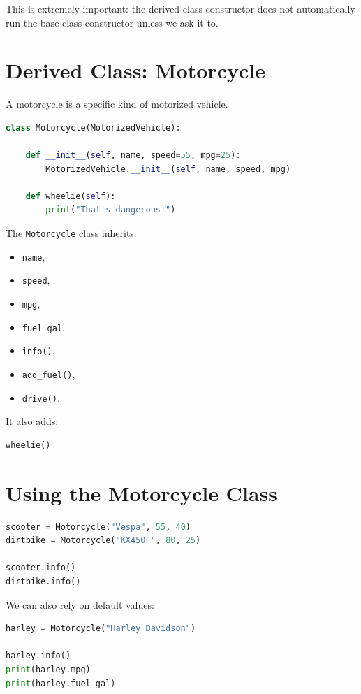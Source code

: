 \documentclass[11pt]{article}
\begin{document}
This is extremely important: the derived class constructor does not automatically run the base class constructor unless we ask it to.

\section{Derived Class: Motorcycle}

A motorcycle is a specific kind of motorized vehicle.

\begin{lstlisting}[language=Python]
class Motorcycle(MotorizedVehicle):

    def __init__(self, name, speed=55, mpg=25):
        MotorizedVehicle.__init__(self, name, speed, mpg)

    def wheelie(self):
        print("That's dangerous!")
\end{lstlisting}

The \texttt{Motorcycle} class inherits:

\begin{itemize}
    \item \texttt{name},
    \item \texttt{speed},
    \item \texttt{mpg},
    \item \texttt{fuel\_gal},
    \item \texttt{info()},
    \item \texttt{add\_fuel()},
    \item \texttt{drive()}.
\end{itemize}

It also adds:

\begin{lstlisting}[language=Python]
wheelie()
\end{lstlisting}

\section{Using the Motorcycle Class}

\begin{lstlisting}[language=Python]
scooter = Motorcycle("Vespa", 55, 40)
dirtbike = Motorcycle("KX450F", 80, 25)

scooter.info()
dirtbike.info()
\end{lstlisting}

We can also rely on default values:

\begin{lstlisting}[language=Python]
harley = Motorcycle("Harley Davidson")

harley.info()
print(harley.mpg)
print(harley.fuel_gal)
\end{lstlisting}
\end{document}
